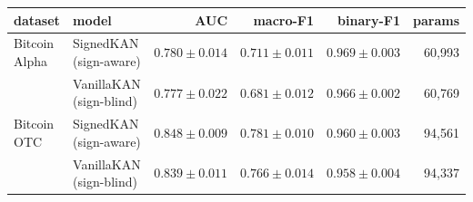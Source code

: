 \begin{tabular}{@{}llrrrr@{}}
\toprule
dataset & model & AUC & macro-F1 & binary-F1 & params \\
\midrule
Bitcoin Alpha & SignedKAN (sign-aware) & $0.780\pm0.014$ & $\mathbf{0.711}\pm0.011$ & $0.969\pm0.003$ & 60,993 \\
 & VanillaKAN (sign-blind) & $0.777\pm0.022$ & $0.681\pm0.012$ & $0.966\pm0.002$ & 60,769 \\
\midrule
Bitcoin OTC & SignedKAN (sign-aware) & $0.848\pm0.009$ & $\mathbf{0.781}\pm0.010$ & $0.960\pm0.003$ & 94,561 \\
 & VanillaKAN (sign-blind) & $0.839\pm0.011$ & $0.766\pm0.014$ & $0.958\pm0.004$ & 94,337 \\
\bottomrule
\end{tabular}
